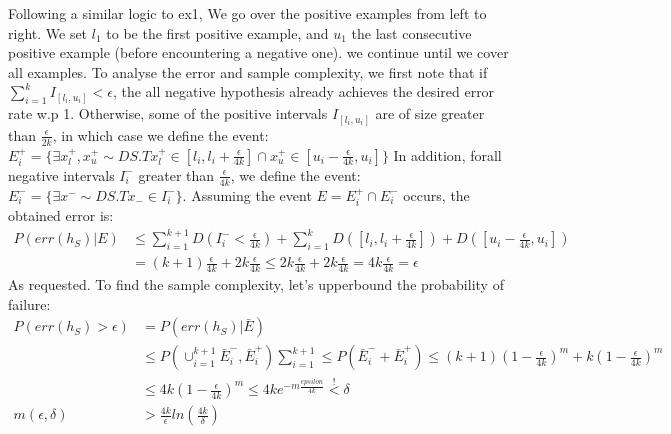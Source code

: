 Following a similar logic to ex1, We go over the positive examples from left to right. We set $l_1$ to be the first positive example, and $u_1$ the last consecutive positive example (before encountering a negative one). we continue until we cover all examples.
To analyse the error and sample complexity, we first note that if $\sum_{i=1}^k I_{[l_i, u_i]} < \epsilon$, the all negative hypothesis already achieves the desired error rate w.p 1. Otherwise, some of the positive intervals $I_{[l_i, u_i]}$ are of size greater than $\frac{\epsilon}{2k}$, in which case we define the event:
$E^+_i = \{\exists x^+_l,x^+_u \sim D S.T x^+_l \in [l_i, l_i + \frac{\epsilon}{4k}] \cap  x^+_u \in [u_i - \frac{\epsilon}{4k}, u_i]\}$
In addition, forall negative intervals $I^-_i$ greater than $\frac{\epsilon}{4k}$, we define the event:
$E^-_i = \{\exists x^- \sim D S.T x_- \in I^-_i\}$.
Assuming the event $E = E^+_i \cap E^-_i$ occurs, the obtained error is:
\begin{equation*}
    \begin{split}        
        P(err(h_S) | E) &\leq \sum_{i=1}^{k+1} D(I^-_i < \frac{\epsilon}{4k}) + \sum_{i=1}^k D([l_i, l_i + \frac{\epsilon}{4k}]) + D([u_i - \frac{\epsilon}{4k}, u_i]) \\
        &= (k+1) \frac{\epsilon}{4k} + 2k\frac{\epsilon}{4k} \leq 2k\frac{\epsilon}{4k} + 2k\frac{\epsilon}{4k} = 4k\frac{\epsilon}{4k} = \epsilon
    \end{split}
\end{equation*}
As requested. To find the sample complexity, let's upperbound the probability of failure:
\begin{equation*}
    \begin{split}
        P(err(h_S) > \epsilon) &= P(err(h_S) | \bar{E}) \\
        &\leq P(\cup_{i=1}^{k+1} \bar{E}^-_i, \bar{E}^+_i) \sum_{i=1}^{k+1}\leq P(\bar{E}^-_i + \bar{E}^+_i) \leq (k+1)(1-\frac{\epsilon}{4k})^m  + k(1-\frac{\epsilon}{4k})^m \\
        &\leq 4k(1-\frac{\epsilon}{4k})^m \leq 4ke^{-m\frac{epsilon}{4k}} \overset{!}{<} \delta \\ 
        m(\epsilon, \delta) &> \frac{4k}{\epsilon} ln(\frac{4k}{\delta})
    \end{split}
\end{equation*}
